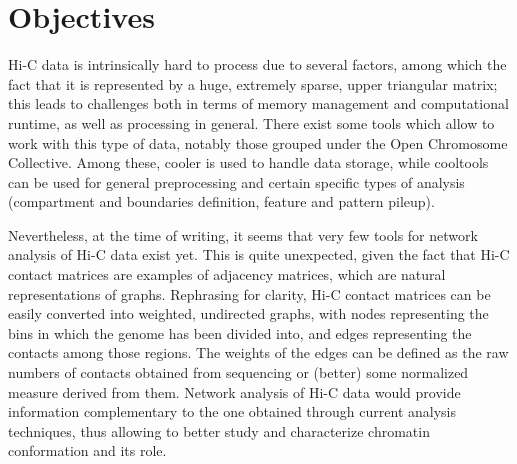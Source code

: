 \graphicspath{{chapters/03_objectives/}}
\chapter{Objectives}


Hi-C data is intrinsically hard to process due to several factors, among which the fact that it is represented by a huge, extremely sparse, upper triangular matrix; this leads to challenges both in terms of memory management and computational runtime, as well as processing in general. There exist some tools which allow to work with this type of data, notably those grouped under the Open Chromosome Collective\cite{openchromosomecollective}. Among these, cooler\cite{cooler2020} is used to handle data storage, while cooltools\cite{cooltools2022} can be used for general preprocessing and certain specific types of analysis (compartment and boundaries definition, feature and pattern pileup). 

Nevertheless, at the time of writing, it seems that very few tools for network analysis of Hi-C data exist yet\cite{chromatinnetworks2023}. This is quite unexpected, given the fact that Hi-C contact matrices are examples of adjacency matrices, which are natural representations of graphs. Rephrasing for clarity, Hi-C contact matrices can be easily converted into weighted, undirected graphs, with nodes representing the bins in which the genome has been divided into, and edges representing the contacts among those regions. The weights of the edges can be defined as the raw numbers of contacts obtained from sequencing or (better) some normalized measure derived from them. Network analysis of Hi-C data would provide information complementary to the one obtained through current analysis techniques, thus allowing to better study and characterize chromatin conformation and its role. 

